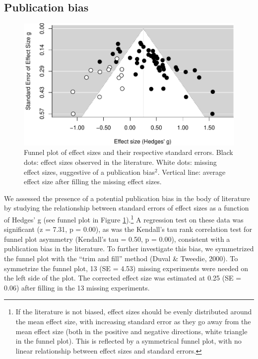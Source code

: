 \documentclass[man]{apa6}
\let\rmarkdownfootnote\footnote%
\def\footnote{\protect\rmarkdownfootnote}
\begin{document}
\subsection{Publication bias}\label{publication-bias}

\begin{figure}
\centering
\includegraphics{MA_speech_pref_files/figure-latex/bias-1.pdf}
\caption{\label{fig:bias}Funnel plot of effect sizes and their respective
standard errors. Black dots: effect sizes observed in the literature.
White dots: missing effect sizes, suggestive of a publication
bias\(^2\). Vertical line: average effect size after filling the missing
effect sizes.}
\end{figure}

We assessed the presence of a potential publication bias in the body of
literature by studying the relationship between standard errors of
effect sizes as a function of Hedges' g (see funnel plot in Figure
\ref{fig:bias}).\footnote{If the literature is not biased, effect sizes
  should be evenly distributed around the mean effect size, with
  increasing standard error as they go away from the mean effect size
  (both in the positive and negative directions, white triangle in the
  funnel plot). This is reflected by a symmetrical funnel plot, with no
  linear relationship between effect sizes and standard errors.} A
regression test on these data was significant (z = 7.31, p = 0.00), as
was the Kendall's tau rank correlation test for funnel plot asymmetry
(Kendall's tau = 0.50, p = 0.00), consistent with a publication bias in
the literature. To further investigate this bias, we symmetrized the
funnel plot with the \enquote{trim and fill} method (Duval \& Tweedie,
2000). To symmetrize the funnel plot, 13 (SE = 4.53) missing experiments
were needed on the left side of the plot. The corrected effect size was
estimated at 0.25 (SE = 0.06) after filling in the 13 missing
experiments.
\end{document}
